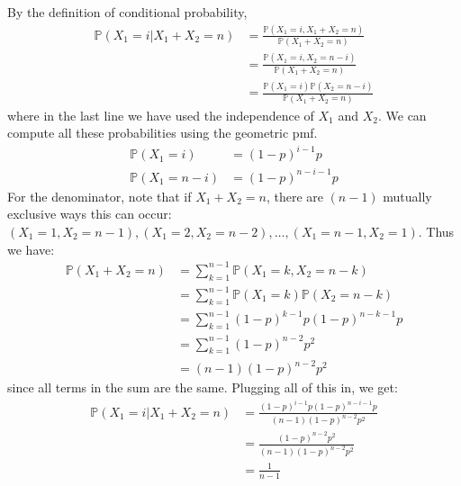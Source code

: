 \documentclass[12pt]{article}
\def\P{{\mathbb P}}
\begin{document}
\begin{enumerate}
By the definition of conditional probability,
\begin{align*}
\P(X_1 = i | X_1 + X_2 = n) &= \frac{ \P(X_1 = i, X_1 + X_2 = n) }{ \P(X_1 + X_2 = n) } \\
&= \frac{ \P(X_1 = i, X_2 = n - i ) }{ \P(X_1 + X_2 = n) } \\
&= \frac{ \P(X_1 = i) \P(X_2 = n - i ) }{ \P(X_1 + X_2 = n) }
\end{align*}
where in the last line we have used the independence of $X_1$ and $X_2$. We can compute all these probabilities using the geometric pmf.
\begin{align*}
\P(X_1 = i) & = (1-p)^{i-1} p \\
\P(X_1 = n - i) & = (1-p)^{n-i-1} p
\end{align*}
For the denominator, note that if $X_1 + X_2 = n$, there are $(n-1)$ mutually exclusive ways this can occur: $(X_1 = 1, X_2 = n - 1), (X_1 = 2, X_2 = n - 2), \dots, (X_1 = n-1, X_2 = 1)$. Thus we have:
\begin{align*}
\P(X_1 + X_2 = n) &= \sum_{k=1}^{n-1} \P(X_1 = k, X_2 = n-k) \\
&= \sum_{k=1}^{n-1} \P(X_1 = k) \P(X_2 = n-k) \\
&= \sum_{k=1}^{n-1} (1-p)^{k-1} p (1-p)^{n-k-1} p \\
&= \sum_{k=1}^{n-1} (1-p)^{n-2}p^2 \\
&= (n-1)(1-p)^{n-2}p^2
\end{align*} 
since all terms in the sum are the same. Plugging all of this in, we get:
\begin{align*}
\P(X_1 = i | X_1 + X_2 = n) &= \frac{ (1-p)^{i-1} p (1-p)^{n-i-1} p }{ (n-1)(1-p)^{n-2}p^2 } \\
&= \frac{ (1-p)^{n-2} p^2 }{ (n-1)(1-p)^{n-2}p^2 } \\
&= \frac{1}{n-1}
\end{align*}
\end{enumerate}
\end{document}
